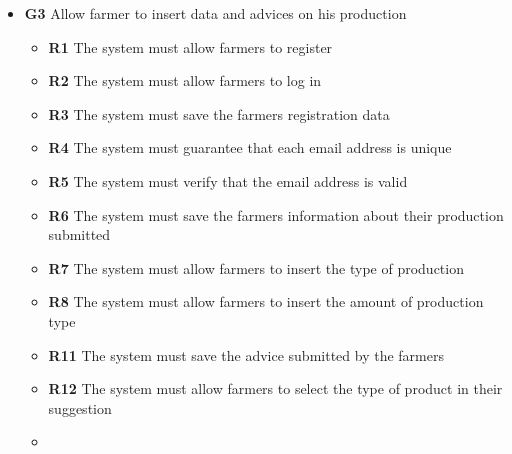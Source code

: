 \begin{itemize}
\item \textbf{G3} Allow farmer to insert data and advices on his production
    \begin{itemize}
    \renewcommand\labelitemi{--}
    \item \textbf{R1} The system must allow farmers to register
    \item \textbf{R2} The system must allow farmers to log in
    \item \textbf{R3} The system must save the farmers registration data
    \item \textbf{R4} The system must guarantee that each email address is unique
    \item \textbf{R5} The system must verify that the email address is valid
    \item \textbf{R6} The system must save the farmers information about their production submitted
    \item \textbf{R7} The system must allow farmers to insert the type of production
    \item \textbf{R8} The system must allow farmers to insert the amount of production type
    \item \textbf{R11} The system must save the advice submitted by the farmers
    \item \textbf{R12} The system must allow farmers to select the type of product in their suggestion
    \item \textbf{}
    \end{itemize} 


\end{itemize}

